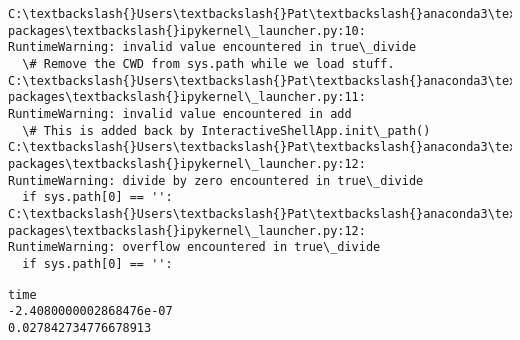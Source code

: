 \documentclass[11pt]{article}
\begin{document}
\begin{Verbatim}[commandchars=\\\{\}]
C:\textbackslash{}Users\textbackslash{}Pat\textbackslash{}anaconda3\textbackslash{}lib\textbackslash{}site-packages\textbackslash{}ipykernel\_launcher.py:10:
RuntimeWarning: invalid value encountered in true\_divide
  \# Remove the CWD from sys.path while we load stuff.
C:\textbackslash{}Users\textbackslash{}Pat\textbackslash{}anaconda3\textbackslash{}lib\textbackslash{}site-packages\textbackslash{}ipykernel\_launcher.py:11:
RuntimeWarning: invalid value encountered in add
  \# This is added back by InteractiveShellApp.init\_path()
C:\textbackslash{}Users\textbackslash{}Pat\textbackslash{}anaconda3\textbackslash{}lib\textbackslash{}site-packages\textbackslash{}ipykernel\_launcher.py:12:
RuntimeWarning: divide by zero encountered in true\_divide
  if sys.path[0] == '':
C:\textbackslash{}Users\textbackslash{}Pat\textbackslash{}anaconda3\textbackslash{}lib\textbackslash{}site-packages\textbackslash{}ipykernel\_launcher.py:12:
RuntimeWarning: overflow encountered in true\_divide
  if sys.path[0] == '':
    \end{Verbatim}

    \begin{Verbatim}[commandchars=\\\{\}]
time
-2.4080000002868476e-07
0.027842734776678913
    \end{Verbatim}
\end{document}
